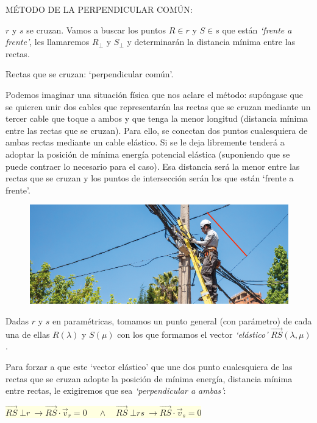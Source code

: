 \vspace{4mm} \noindent MÉTODO DE LA PERPENDICULAR COMÚN: 

$r$ y $s$ se cruzan. Vamos a buscar los puntos $R\in r$ y $S\in s$ que están \textit{`frente a frente'}, les llamaremos $R_\bot$ y $S_\bot$ y determinarán la distancia mínima entre las rectas.

\begin{myexampleblock}{Rectas que se cruzan: `perpendicular común'.}
	
	Podemos imaginar una situación física que nos aclare el método: supóngase que se quieren unir dos cables que representarán las rectas que se cruzan mediante un tercer cable que toque a ambos y que tenga la menor longitud (distancia mínima entre las rectas que se cruzan). Para ello, se conectan dos puntos cualesquiera de ambas rectas mediante un cable elástico. Si se le deja libremente tenderá a adoptar la posición de mínima energía potencial elástica (suponiendo que se puede contraer lo necesario para el caso). Esa distancia será la menor entre las rectas que se cruzan y los puntos de intersección serán los que están `frente a frente'.
	
	\begin{figure}[H]
		\centering
		\includegraphics[width=1\textwidth]{imagenes/imagenes11/T11IM16.png}
	\end{figure}
\end{myexampleblock}


\noindent Dadas $r$ y $s$ en paramétricas, tomamos un punto general (con parámetro) de cada una de ellas $R(\lambda)$ y $S(\mu)$ con los que formamos el vector \textit{`elástico'} $\overrightarrow{RS}(\lambda,\mu)$.

\noindent Para forzar a que este `vector elástico' que une dos punto cualesquiera de las rectas que se cruzan adopte la posición de mínima energía, distancia mínima entre rectas, le exigiremos que sea 	\textit{`perpendicular a ambas'}:

\vspace{2mm}\colorbox{LightYellow}{$\overrightarrow{RS} \;\bot r \ \to \overrightarrow{RS}\cdot \vec v_r=0\; \quad \wedge \quad  \overrightarrow{RS} \;\bot r
s \ \to \overrightarrow{RS}\cdot \vec v_s=0$}

